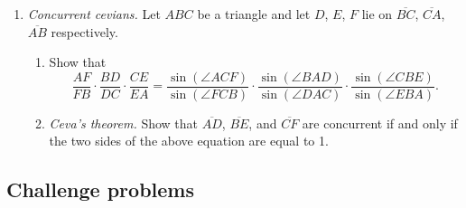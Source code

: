 \begin{enumerate}
\begin{enumerate}
\end{enumerate}
\item \emph{Concurrent cevians.} Let $ABC$ be a triangle and let $D$, $E$, $F$ lie on $\overline{BC}$, $\overline{CA}$, $\overline{AB}$ respectively.
\begin{enumerate}
\item Show that
\begin{equation*}
\frac{AF}{FB}\cdot\frac{BD}{DC}\cdot\frac{CE}{EA} = \frac{\sin(\angle ACF)}{\sin(\angle FCB)}\cdot\frac{\sin(\angle BAD)}{\sin(\angle DAC)}\cdot\frac{\sin(\angle CBE)}{\sin(\angle EBA)}.
\end{equation*}
\item \emph{Ceva's theorem.} Show that $\overline{AD}$, $\overline{BE}$, and $\overline{CF}$ are concurrent if and only if the two sides of the above equation are equal to 1.
\end{enumerate}
\end{enumerate}


\subsection{Challenge problems}

